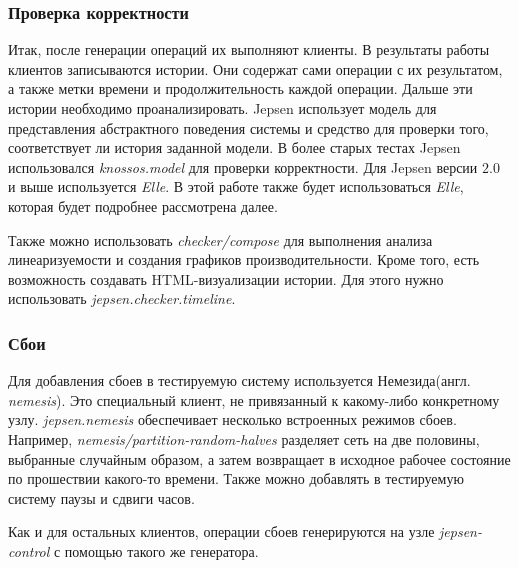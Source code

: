\documentclass[14pt,  openany]{book}
\begin{document}
\subsubsection{Проверка корректности}
Итак, после генерации операций их выполняют клиенты. В результаты работы клиентов записываются истории. Они содержат сами операции с их результатом, а также метки времени и продолжительность каждой операции.  Дальше эти истории необходимо проанализировать. Jepsen использует модель для представления абстрактного поведения системы и средство для проверки того, соответствует ли история заданной модели.  В более старых тестах Jepsen использовался \textit{knossos.model} для проверки корректности.   Для Jepsen версии $2.0$ и выше используется \textit{Elle}. В этой работе также будет использоваться  \textit{Elle}, которая будет подробнее рассмотрена далее.
\par Также можно использовать \textit{checker/compose} для выполнения анализа линеаризуемости и создания графиков производительности. Кроме того, есть возможность создавать HTML-визуализации истории. Для этого нужно использовать \textit{jepsen.checker.timeline}.

\subsubsection{Сбои}
Для добавления сбоев в тестируемую систему используется Немезида(англ. \textit{nemesis}). Это специальный клиент, не привязанный к какому-либо конкретному узлу.  \textit{jepsen.nemesis} обеспечивает несколько встроенных режимов  сбоев.  Например, \textit{nemesis/partition-random-halves} разделяет сеть на две половины, выбранные случайным образом, а затем возвращает в исходное рабочее состояние по прошествии какого-то времени. Также можно добавлять в тестируемую систему паузы и сдвиги часов.
\par Как и для остальных клиентов, операции сбоев генерируются на узле \textit{jepsen-control} с помощью такого же генератора. 
\end{document}

